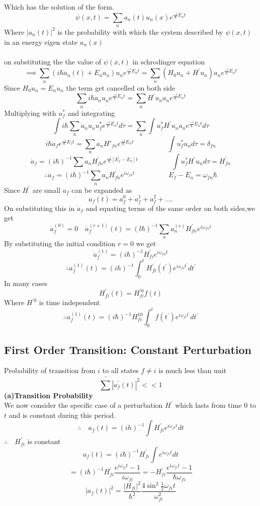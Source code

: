 Which has the solution of the form.
$$\psi(x,t)=\sum_{n}a_n(t)u_n(x)e^{\frac{-i}{\hbar }E_nt}$$
Where $|a_n(t)|^2$ is the probability with which the system described by $\psi(x,t)$ in an energy eigen state $u_n(x)$\\\\
on substituting the the value of $\psi(x,t)$ in schrodinger equation 
$$\implies\sum_{n}(i\hbar \dot{a}_n(t)+E_na_n)u_n e^{\frac{-i}{\hbar} E_nt}=\sum_{n}(H_0u_n+H^\prime u_n)a_ne^{\frac{-i}{\hbar}E_nt}$$
Since $H_0u_n=E_nu_n$ the term get cancelled on both side\\
$$\sum_{n}i\hbar\dot{a}_nu_ne^{\frac{-i}{\hbar}E_nt}=\sum_{n}H^\prime u_n a_n e^{\frac{-i}{\hbar}E_nt}$$
Multiplying with $u_f^*$ and integrating\\
$$ \int i\hbar \sum_{n} \dot{a}_n u_n u_f^* e^{\frac{-i}{\hbar}E_nt}d\tau=\sum_{n}\int u_f^*H^\prime u_na_ne^{\frac{-i}{\hbar}E_nt}d\tau$$
$$ i\hbar{\dot{a}}_f e^{\frac{-i}{\hbar}E_ft}=\sum_{n}a_n {H\prime} _{fn} e^{\frac{-i}{\hbar}E_nt}\hspace{2cm}
\int u_f^* u_n d\tau=\delta_{fn}$$
$$ \dot{a}_f =(i\hbar)^{-1}\sum a_n H^\prime_{fn}e^{\frac{-i}{\hbar}[E_f-E_n]t}\hspace{2cm}\int u_f^* H^\prime u_n d\tau=H^\prime_{fn}$$
$$\therefore \dot{a}_f=(i\hbar)^{-1}\sum_n a_n H^\prime_{fn}e^{i\omega_{fn}t}\hspace{2cm}E_f-E_n=\omega_{fn}\hbar
$$
Since $H^\prime$ are small $a_f$ can be expanded as \\
$$a_f(t)=a_f^0+a_f^1+a_f^2+....$$
On substituting this in $\dot{a}_f$ and equating terms of the same order on both sides,we get
$$\dot{a}_f^{(0)}=0\quad \dot{a}_f^{(r+1)}(t)=(l\hbar)^{-1}\sum_n
a_n^{(r)}H_{fn}^\prime e^{i\omega_{fn}t}$$
By substituting the initial condition $r=0$ we get
$$\dot{a}_f^{(1)}=(i\hbar)^{-1}H^{\prime}_{fi}e^{i\omega_{fn}t}$$
$$\therefore a_f^{(1)}(t)=(ih)^{-1}\int_{0}^{t}H^\prime_{fl}(t^\prime)e^{i\omega_{fi}t^{\prime}}dt^\prime$$
In many cases\\
$$H^\prime _{fi}(t)=H_{fi}^{\prime 0}f(t)$$
Where $H^{\prime 0}$ is time independent\\
$$\therefore a_f^{(1)}(t)=(i\hbar)^{-1}H^{10}_{fi}\int_{0}^{t}f(t^\prime)e^{i\omega_{fi}t^{\prime}}dt^\prime$$
\subsection{First Order Transition: Constant Perturbation }
Probability of transition from $i $ to all states $f\neq i$ is much less than unit
$$ \sum^\prime|a^\prime_f(t)|^2<<1$$
\textbf{(a)\quad Transition Probability }\\
We now consider the specific case of a perturbation $H^\prime$ which lasts from time $0  $ to $t$ and is constant during this period.\\
$$\therefore \quad  a_f(t)=(ih)^{-1}\int H^\prime _{fi}e^{i\omega_{fi}t}dt $$ 
$\therefore \quad H^\prime_{fi}$ is constant\\
$$a_f(t)=(i\hbar)^{-1}H^\prime_{fi}\int e^{i\omega_{fi}t}dt$$
$$=(i\hbar)^{-1}H^\prime_{fi}\frac{e^{i\omega_{fi}t}-1}{i\omega_{fi}}=-H^\prime_{fi}\frac{e^{i\omega_{fi}t}-1}{\hbar\omega_{fi}}$$
$$|a_f(t)|^2=\frac{|H_{fi}|^2}{\hbar^2}\frac{4\sin^2\frac{1}{2}\omega_{fi}t}{\omega_{fi}^2}$$

